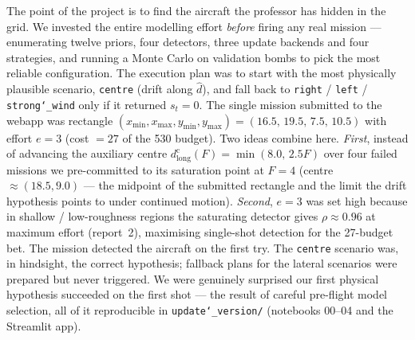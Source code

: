 \documentclass[11pt,a4paper]{article}
\begin{document}
The point of the project is to find the aircraft the professor has hidden
in the grid. We invested the entire modelling effort \emph{before} firing
any real mission --- enumerating twelve priors, four detectors, three update
backends and four strategies, and running a Monte Carlo on validation bombs
to pick the most reliable configuration. The execution plan was to start
with the most physically plausible scenario, \texttt{centre} (drift
along $\hat d$), and fall back to \texttt{right} / \texttt{left} /
\texttt{strong\char`_wind} only if it returned $s_t = 0$. The single mission
submitted to the webapp was rectangle
$(x_{\min}, x_{\max}, y_{\min}, y_{\max}) = (16.5,\,19.5,\,7.5,\,10.5)$ with
effort $e = 3$ (cost $= 27$ of the 530 budget). Two ideas combine here.
\emph{First}, instead of advancing the auxiliary centre
$d_{\mathrm{long}}^{\mathrm{c}}(F) = \min(8.0,\,2.5F)$ over four failed
missions we pre-committed to its saturation point at $F = 4$
(centre $\approx (18.5, 9.0)$ --- the midpoint of the submitted rectangle
and the limit the drift hypothesis points to under continued motion).
\emph{Second}, $e = 3$ was set high because in shallow / low-roughness
regions the saturating detector gives $\rho \approx 0.96$ at maximum effort
(report~2), maximising single-shot detection for the 27-budget bet.
The mission detected the aircraft on the first try. The
\texttt{centre} scenario was, in hindsight, the correct hypothesis;
fallback plans for the lateral scenarios were prepared but never triggered.
We were genuinely surprised our first physical hypothesis succeeded on the
first shot --- the result of careful pre-flight model selection, all of it
reproducible in \texttt{update\char`_version/} (notebooks 00--04 and the
Streamlit app).
\end{document}
